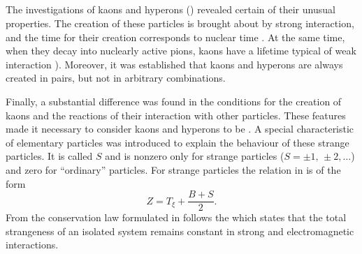 \subsection{}\label{43.4.4} The investigations of kaons and hyperons () revealed certain of their unusual properties. The creation of these particles is brought about by strong interaction, and the time for their creation corresponds to nuclear time . At the same time, when they decay into nuclearly active pions, kaons have a lifetime typical of weak interaction ). Moreover, it was established that kaons and hyperons are always created in pairs, but not in arbitrary combinations. 

Finally, a substantial difference was found in the conditions for the creation of kaons and the reactions of their interaction with other particles. These features made it necessary to consider kaons and hyperons to be . A special characteristic of elementary particles was introduced to explain the behaviour of these strange particles. It is called  $S$ and is nonzero only for strange particles ($S = \pm 1,\, \pm 2, \ldots{}$) and zero for ``ordinary'' particles. For strange particles the relation in  is of the form
\begin{equation*}%
Z = T_{\xi} + \frac{B +S}{2}.
\end{equation*}
From the conservation law formulated in  follows the  which states that the total strangeness of an isolated system remains constant in strong and electromagnetic interactions.

